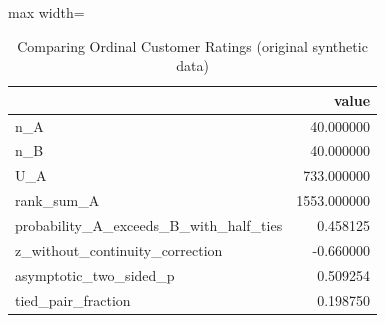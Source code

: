 \begin{table}[htbp]
\centering
\caption{Comparing Ordinal Customer Ratings (original synthetic data)}
\begingroup
\small
\setlength{\tabcolsep}{6pt}
\renewcommand{\arraystretch}{1.12}
\begin{adjustbox}{max width=\linewidth}
\begin{tabular}{@{}lr@{}}
\toprule
 & value \\
\midrule
n\_A & 40.000000 \\
n\_B & 40.000000 \\
U\_A & 733.000000 \\
rank\_sum\_A & 1553.000000 \\
probability\_A\_exceeds\_B\_with\_half\_ties & 0.458125 \\
z\_without\_continuity\_correction & -0.660000 \\
asymptotic\_two\_sided\_p & 0.509254 \\
tied\_pair\_fraction & 0.198750 \\
\bottomrule
\end{tabular}
\end{adjustbox}
\endgroup
\end{table}